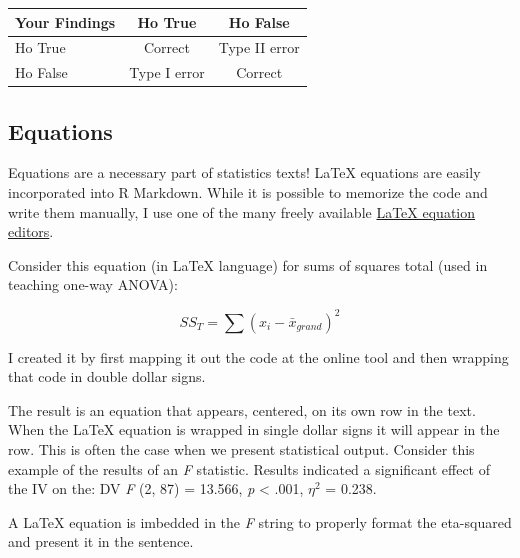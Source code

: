 \documentclass[
]{book}
\newenvironment{Shaded}{\begin{snugshade}}{\end{snugshade}}
\newcommand{\DecValTok}[1]{\textcolor[rgb]{0.00,0.00,0.81}{#1}}
\newcommand{\ErrorTok}[1]{\textcolor[rgb]{0.64,0.00,0.00}{\textbf{#1}}}
\newcommand{\FunctionTok}[1]{\textcolor[rgb]{0.00,0.00,0.00}{#1}}
\newcommand{\NormalTok}[1]{#1}
\newcommand{\OtherTok}[1]{\textcolor[rgb]{0.56,0.35,0.01}{#1}}
\newcommand{\SpecialCharTok}[1]{\textcolor[rgb]{0.00,0.00,0.00}{#1}}
\begin{document}
\begin{longtable}[]{@{}lcc@{}}
\toprule
Your Findings & Ho True & Ho False \\
\midrule
\endhead
Ho True & Correct & Type II error \\
Ho False & Type I error & Correct \\
\bottomrule
\end{longtable}

\hypertarget{equations}{%
\subsection{Equations}\label{equations}}

Equations are a necessary part of statistics texts! LaTeX equations are easily incorporated into R Markdown. While it is possible to memorize the code and write them manually, I use one of the many freely available \href{https://www.codecogs.com/latex/eqneditor.php}{LaTeX equation editors}.

Consider this equation (in LaTeX language) for sums of squares total (used in teaching one-way ANOVA):

\[SS_{T}= \sum (x_{i}-\bar{x}_{grand})^{2}\]

I created it by first mapping it out the code at the online tool and then wrapping that code in double dollar signs.

\begin{Shaded}
\end{Shaded}

The result is an equation that appears, centered, on its own row in the text. When the LaTeX equation is wrapped in single dollar signs it will appear in the row. This is often the case when we present statistical output. Consider this example of the results of an \emph{F} statistic. Results indicated a significant effect of the IV on the: DV \emph{F} (2, 87) = 13.566, \emph{p} \textless{} .001, \(\eta^2\) = 0.238.

A LaTeX equation is imbedded in the \emph{F} string to properly format the eta-squared and present it in the sentence.
\end{document}
